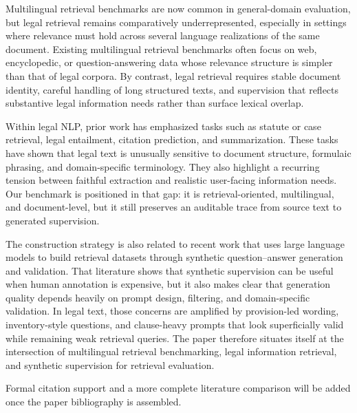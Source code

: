 Multilingual retrieval benchmarks are now common in general-domain evaluation, but legal retrieval remains comparatively underrepresented, especially in settings where relevance must hold across several language realizations of the same document. Existing multilingual retrieval benchmarks often focus on web, encyclopedic, or question-answering data whose relevance structure is simpler than that of legal corpora. By contrast, legal retrieval requires stable document identity, careful handling of long structured texts, and supervision that reflects substantive legal information needs rather than surface lexical overlap.

Within legal NLP, prior work has emphasized tasks such as statute or case retrieval, legal entailment, citation prediction, and summarization. These tasks have shown that legal text is unusually sensitive to document structure, formulaic phrasing, and domain-specific terminology. They also highlight a recurring tension between faithful extraction and realistic user-facing information needs. Our benchmark is positioned in that gap: it is retrieval-oriented, multilingual, and document-level, but it still preserves an auditable trace from source text to generated supervision.

The construction strategy is also related to recent work that uses large language models to build retrieval datasets through synthetic question--answer generation and validation. That literature shows that synthetic supervision can be useful when human annotation is expensive, but it also makes clear that generation quality depends heavily on prompt design, filtering, and domain-specific validation. In legal text, those concerns are amplified by provision-led wording, inventory-style questions, and clause-heavy prompts that look superficially valid while remaining weak retrieval queries. The paper therefore situates itself at the intersection of multilingual retrieval benchmarking, legal information retrieval, and synthetic supervision for retrieval evaluation.

Formal citation support and a more complete literature comparison will be added once the paper bibliography is assembled.

